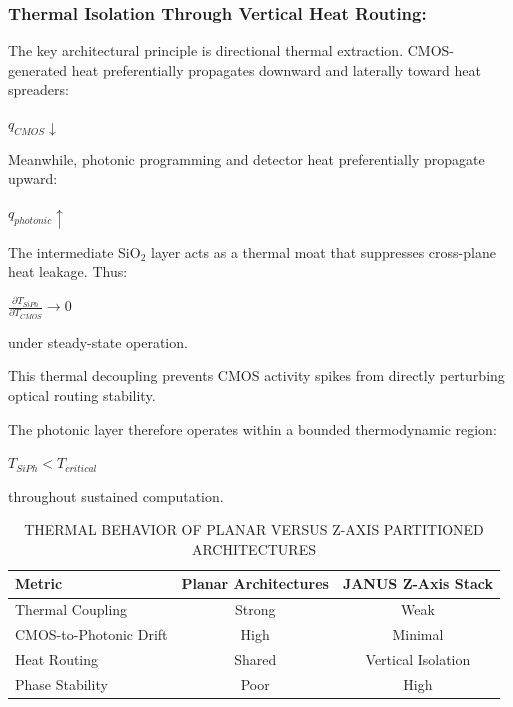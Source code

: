 \documentclass[journal]{IEEEtran}
\begin{document}
\subsubsection{\textbf{Thermal Isolation Through Vertical Heat Routing:}}

The key architectural principle is directional thermal extraction. CMOS-generated heat preferentially propagates downward and laterally toward heat spreaders:

\begin{center}
\textbf{$q_{CMOS} \downarrow$}
\end{center}

Meanwhile, photonic programming and detector heat preferentially propagate upward:
\begin{center}
\textbf{$q_{photonic} \uparrow$}
\end{center}

The intermediate SiO$_2$ layer acts as a thermal moat that suppresses cross-plane heat leakage. Thus:

\begin{center}
\textbf{$\frac {\partial T_{SiPh}}{ \partial T_{CMOS}} \rightarrow 0$}
\end{center}

under steady-state operation.

This thermal decoupling prevents CMOS activity spikes from directly perturbing optical routing stability.

The photonic layer therefore operates within a bounded thermodynamic region:

\begin{center}
\textbf{$T_{SiPh} < T_{critical}$}
\end{center}

throughout sustained computation.

\begin{table}[htbp]
\centering
\small
\setlength{\tabcolsep}{1pt}
\caption{THERMAL BEHAVIOR OF PLANAR VERSUS Z-AXIS PARTITIONED ARCHITECTURES}
\label{tab:table10}
\begin{tabular}{lcc}
\toprule
Metric & Planar Architectures & JANUS Z-Axis Stack \\
\midrule
Thermal Coupling & Strong & Weak \\
CMOS-to-Photonic Drift & High & Minimal \\
Heat Routing & Shared & Vertical Isolation \\
Phase Stability & Poor & High \\
\bottomrule
\end{tabular}
\end{table}
\end{document}
